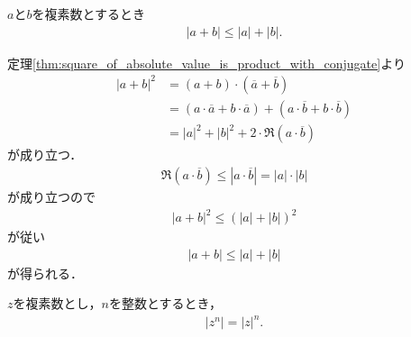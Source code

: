	\begin{screen}
		\begin{thm}[劣加法性]
			$a$と$b$を複素数とするとき
			\begin{align}
				|a + b| \leq |a| + |b|.
			\end{align}
		\end{thm}
	\end{screen}
	
	\begin{sketch}
		定理\ref{thm:square_of_absolute_value_is_product_with_conjugate}より
		\begin{align}
			|a + b|^2 &= (a + b) \cdot (\overline{a} + \overline{b}) \\
			&= (a \cdot \overline{a} + b \cdot \overline{a})
			+ (a \cdot \overline{b} + b \cdot \overline{b}) \\
			&= |a|^2 + |b|^2 + 2 \cdot \Re{(a \cdot \overline{b})}
		\end{align}
		が成り立つ．
		\begin{align}
			\Re{(a \cdot \overline{b})}
			\leq |a \cdot \overline{b}|
			= |a| \cdot |b|
		\end{align}
		が成り立つので
		\begin{align}
			|a + b|^2 \leq (|a| + |b|)^2
		\end{align}
		が従い
		\begin{align}
			|a + b| \leq |a| + |b|
		\end{align}
		が得られる．
		\QED
	\end{sketch}
	
	\begin{screen}
		\begin{thm}[整数乗の絶対値は絶対値の整数乗]
			$z$を複素数とし，$n$を整数とするとき，
			\begin{align}
				|z^{n}| = |z|^{n}.
			\end{align}
		\end{thm}
	\end{screen}
	
